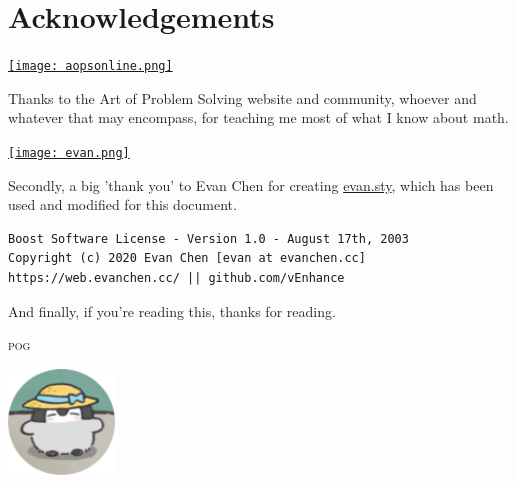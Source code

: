 \author{pog}
\date{\today}
\maketitle

\tableofcontents
\vspace{18.7px}
\newpage
\section{Acknowledgements}
\begin{center}
\href{aops.com/community}{\texttt{[image: aopsonline.png]}}
\end{center}
Thanks to the Art of Problem Solving website and community, whoever and whatever that may encompass, for teaching me most of what I know about math.

\begin{center}
\href{evanchen.cc}{\texttt{[image: evan.png]}}
\end{center}
Secondly, a big 'thank you' to Evan Chen for creating \href{https://github.com/vEnhance/dotfiles/blob/main/texmf/tex/latex/evan/evan.sty}{evan.sty}, which has been used and modified for this document.

\begin{verbatim}
Boost Software License - Version 1.0 - August 17th, 2003
Copyright (c) 2020 Evan Chen [evan at evanchen.cc]
https://web.evanchen.cc/ || github.com/vEnhance
\end{verbatim}
And finally, if you're reading this, thanks for reading.

\vfill

\begin{center}
\LARGE{\textsc{pog}}
\end{center}

\begin{center}
\href{https://artofproblemsolving.com/community/user/492517}{\includegraphics[width=80pt]{penguin.png}}
\end{center}
\newpage
